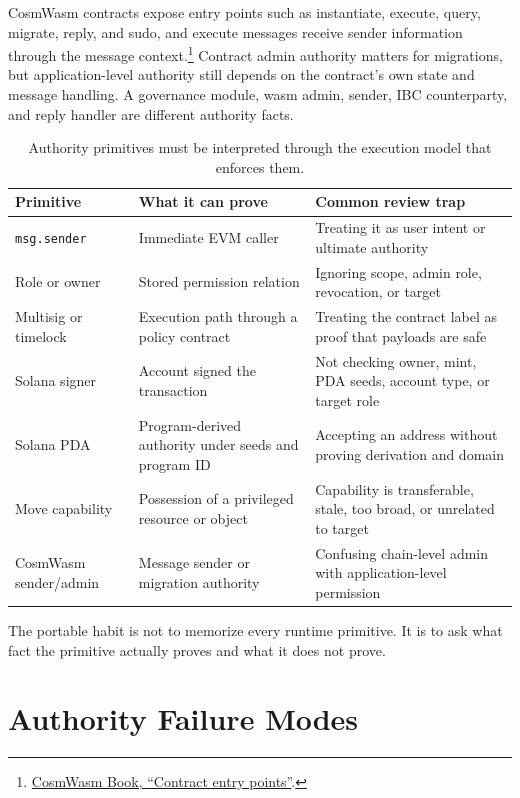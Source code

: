 CosmWasm contracts expose entry points such as instantiate, execute, query, migrate, reply, and sudo, and execute messages receive sender information through the message context.\footnote{\href{https://book.cosmwasm.com/basics/entry-points.html}{CosmWasm Book, ``Contract entry points''}.} Contract admin authority matters for migrations, but application-level authority still depends on the contract's own state and message handling. A governance module, wasm admin, sender, IBC counterparty, and reply handler are different authority facts.

\begin{table}[htbp]
\centering
\small
\renewcommand{\arraystretch}{1.18}
\begin{tabularx}{\textwidth}{@{}>{\RaggedRight\arraybackslash}p{}>{\RaggedRight\arraybackslash}p{}X@{}}
\toprule
Primitive & What it can prove & Common review trap \\
\midrule
\texttt{msg.sender} & Immediate EVM caller & Treating it as user intent or ultimate authority \\
Role or owner & Stored permission relation & Ignoring scope, admin role, revocation, or target \\
Multisig or timelock & Execution path through a policy contract & Treating the contract label as proof that payloads are safe \\
Solana signer & Account signed the transaction & Not checking owner, mint, PDA seeds, account type, or target role \\
Solana PDA & Program-derived authority under seeds and program ID & Accepting an address without proving derivation and domain \\
Move capability & Possession of a privileged resource or object & Capability is transferable, stale, too broad, or unrelated to target \\
CosmWasm sender/admin & Message sender or migration authority & Confusing chain-level admin with application-level permission \\
\bottomrule
\end{tabularx}
\caption{Authority primitives must be interpreted through the execution model that enforces them.}
\end{table}

The portable habit is not to memorize every runtime primitive. It is to ask what fact the primitive actually proves and what it does not prove.

\section{Authority Failure Modes}

